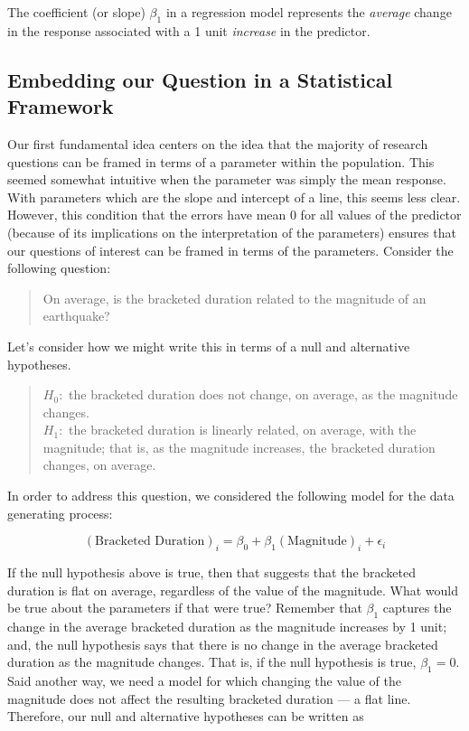 \documentclass[
]{book}
\theoremstyle{plain}
\theoremstyle{mydefn}
\theoremstyle{myexmpl}
\theoremstyle{remark}
\begin{document}
\begin{rmdtip}
The coefficient (or slope) \(\beta_1\) in a regression model represents the \emph{average} change in the response associated with a 1 unit \emph{increase} in the predictor.
\end{rmdtip}

\hypertarget{embedding-our-question-in-a-statistical-framework}{%
\subsection{Embedding our Question in a Statistical Framework}\label{embedding-our-question-in-a-statistical-framework}}

Our first fundamental idea centers on the idea that the majority of research questions can be framed in terms of a parameter within the population. This seemed somewhat intuitive when the parameter was simply the mean response. With parameters which are the slope and intercept of a line, this seems less clear. However, this condition that the errors have mean 0 for all values of the predictor (because of its implications on the interpretation of the parameters) ensures that our questions of interest can be framed in terms of the parameters. Consider the following question:

\begin{quote}
On average, is the bracketed duration related to the magnitude of an earthquake?
\end{quote}

Let's consider how we might write this in terms of a null and alternative hypotheses.

\begin{quote}
\(H_0:\) the bracketed duration does not change, on average, as the magnitude changes.\\
\(H_1:\) the bracketed duration is linearly related, on average, with the magnitude; that is, as the magnitude increases, the bracketed duration changes, on average.
\end{quote}

In order to address this question, we considered the following model for the data generating process:

\[(\text{Bracketed Duration})_i = \beta_0 + \beta_1(\text{Magnitude})_i + \epsilon_i\]

If the null hypothesis above is true, then that suggests that the bracketed duration is flat on average, regardless of the value of the magnitude. What would be true about the parameters if that were true? Remember that \(\beta_1\) captures the change in the average bracketed duration as the magnitude increases by 1 unit; and, the null hypothesis says that there is no change in the average bracketed duration as the magnitude changes. That is, if the null hypothesis is true, \(\beta_1 = 0\). Said another way, we need a model for which changing the value of the magnitude does not affect the resulting bracketed duration --- a flat line. Therefore, our null and alternative hypotheses can be written as
\end{document}
